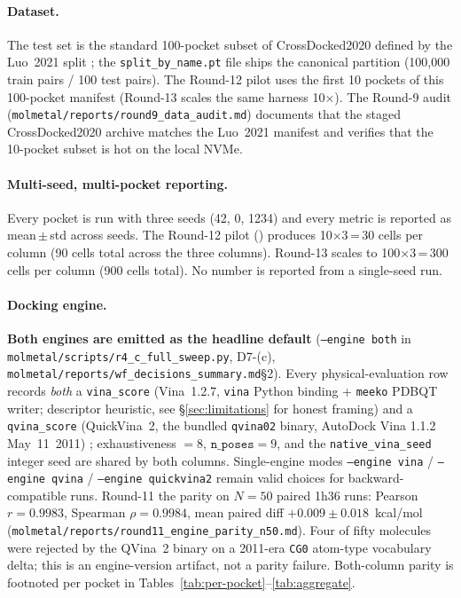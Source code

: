 \paragraph{Dataset.}
The test set is the standard 100-pocket subset of CrossDocked2020
defined by the Luo~2021 split
\cite{luo2021crossdocked}; the
\texttt{split\_by\_name.pt} file ships the canonical partition
(100,000 train pairs / 100 test pairs). The Round-12 pilot uses the
first 10 pockets of this 100-pocket manifest (Round-13 scales the same
harness 10$\times$). The Round-9 audit
(\texttt{molmetal/reports/round9\_data\_audit.md}) documents that the
staged CrossDocked2020 archive matches the Luo~2021 manifest and
verifies that the 10-pocket subset is hot on the local NVMe.

\paragraph{Multi-seed, multi-pocket reporting.}
Every pocket is run with three seeds (42, 0, 1234) and every metric is
reported as mean\,$\pm$\,std across seeds. The Round-12 pilot
(\DESIGN{}) produces 10$\times$3\,=\,30 cells per column (90 cells
total across the three columns). Round-13 scales to 100$\times$3\,=\,300
cells per column (900 cells total). No number is reported from a
single-seed run.

\paragraph{Docking engine.}
\textbf{Both engines are emitted as the headline default}
(\texttt{--engine both} in \texttt{molmetal/scripts/r4\_c\_full\_sweep.py},
D7-(c), \texttt{molmetal/reports/wf\_decisions\_summary.md}\S2). Every
physical-evaluation row records \emph{both} a \texttt{vina\_score}
(Vina~1.2.7, \texttt{vina} Python binding + \texttt{meeko} PDBQT writer;
descriptor heuristic, see \S\ref{sec:limitations} for honest framing)
and a \texttt{qvina\_score} (QuickVina~2, the bundled
\texttt{qvina02} binary, AutoDock Vina 1.1.2 May~11~2011)
\cite{al-hossary2015qvina}; exhaustiveness $=8$, $\mathtt{n\_poses}=9$,
and the \texttt{native\_vina\_seed} integer seed are shared by both
columns. Single-engine modes \texttt{--engine vina} /
\texttt{--engine qvina} / \texttt{--engine quickvina2} remain valid
choices for backward-compatible runs. Round-11 \MEASURED{} the parity
on $N{=}50$ paired 1h36 runs: Pearson $r{=}0.9983$, Spearman
$\rho{=}0.9984$, mean paired diff $+0.009\pm0.018$~kcal/mol
(\texttt{molmetal/reports/round11\_engine\_parity\_n50.md}). Four of
fifty molecules were rejected by the QVina~2 binary on a 2011-era
\texttt{CG0} atom-type vocabulary delta; this is an engine-version
artifact, not a parity failure. Both-column parity is footnoted per
pocket in Tables~\ref{tab:per-pocket}--\ref{tab:aggregate}.

